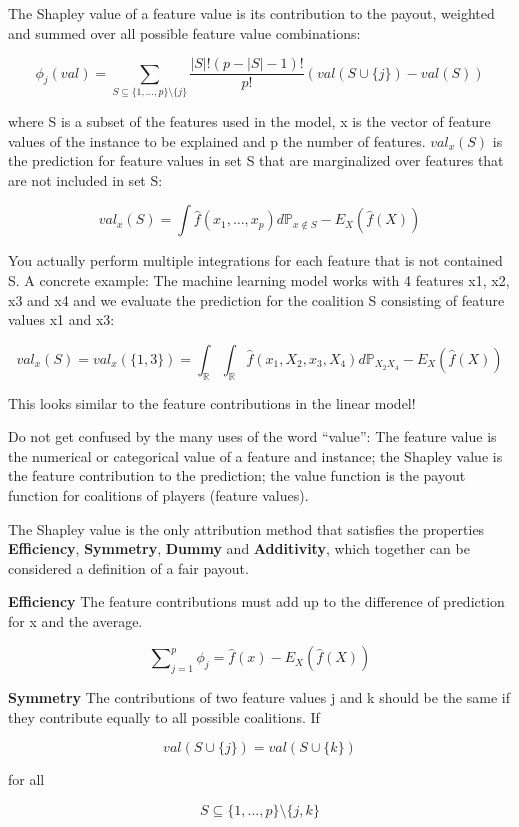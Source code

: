 \documentclass[
  10pt,
]{scrbook}
\begin{document}
The Shapley value of a feature value is its contribution to the payout, weighted and summed over all possible feature value combinations:

\[\phi_j(val)=\sum_{S\subseteq\{1,\ldots,p\}\setminus\{j\}}\frac{|S|!\left(p-|S|-1\right)!}{p!}\left(val\left(S\cup\{j\}\right)-val(S)\right)\]

where S is a subset of the features used in the model, x is the vector of feature values of the instance to be explained and p the number of features.
\(val_x(S)\) is the prediction for feature values in set S that are marginalized over features that are not included in set S:

\[val_{x}(S)=\int\hat{f}(x_{1},\ldots,x_{p})d\mathbb{P}_{x\notin{}S}-E_X(\hat{f}(X))\]

You actually perform multiple integrations for each feature that is not contained S.
A concrete example:
The machine learning model works with 4 features x1, x2, x3 and x4 and we evaluate the prediction for the coalition S consisting of feature values x1 and x3:

\[val_{x}(S)=val_{x}(\{1,3\})=\int_{\mathbb{R}}\int_{\mathbb{R}}\hat{f}(x_{1},X_{2},x_{3},X_{4})d\mathbb{P}_{X_2X_4}-E_X(\hat{f}(X))\]

This looks similar to the feature contributions in the linear model!

Do not get confused by the many uses of the word ``value'':
The feature value is the numerical or categorical value of a feature and instance;
the Shapley value is the feature contribution to the prediction;
the value function is the payout function for coalitions of players (feature values).

The Shapley value is the only attribution method that satisfies the properties \textbf{Efficiency}, \textbf{Symmetry}, \textbf{Dummy} and \textbf{Additivity}, which together can be considered a definition of a fair payout.

\textbf{Efficiency}
The feature contributions must add up to the difference of prediction for x and the average.

\[\sum\nolimits_{j=1}^p\phi_j=\hat{f}(x)-E_X(\hat{f}(X))\]

\textbf{Symmetry}
The contributions of two feature values j and k should be the same if they contribute equally to all possible coalitions.
If

\[val(S \cup \{j\})=val(S\cup\{k\})\]

for all

\[S\subseteq\{1,\ldots, p\}\setminus\{j,k\}\]
\end{document}
